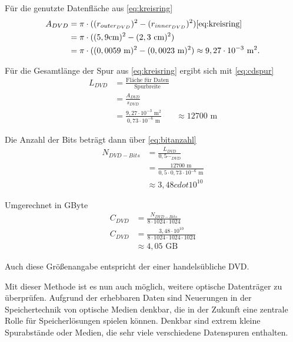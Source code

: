 \documentclass[9pt,twocolumn,twoside]{pnas-new}
\begin{document}
Für die genutzte Datenfläche aus \eqref{eq:kreisring}
\begin{align*}
 A_{DVD} &= \pi\cdot((r_{outer_{DVD}})^2-(r_{inner_{DVD}})^2)  \ref{eq:kreisring}\\	
&= \pi\cdot((5,9\mbox{cm})^2-(2,3\mbox{ cm})^2) \\
 &=  \pi\cdot((0,0059\mbox{ m})^2-(0,0023\mbox{ m})^2) \approx 9,27\cdot10^{-3}\mbox{ m}^2.
\end{align*}

Für die Gesamtlänge der Spur aus \ref{eq:kreisring} ergibt sich mit \eqref{eq:cdspur}
\begin{align*}
 L_{DVD} &= \frac{\mbox{Fläche für Daten}}{\mbox{Spurbreite}}\\
 &= \frac{A_{DVD}}{s_{DVD}}\\
 &= \frac{9,27\cdot10^{-3}\mbox{ m}^2}{0,73\cdot10^{-6}\mbox{ m} }
 &\approx 12700\mbox{ m}
\end{align*}

Die Anzahl der Bits beträgt dann über \eqref{eq:bitanzahl}
\begin{align*}
N_{DVD-Bits} &=  \frac{L_{DVD}}{0,5\cdots_{DVD}}\\
&= \frac{12700\mbox{ m}}{0,5\cdot0,73\cdot10^{-6}\mbox{ m}}\\
&\approx 3,48cdot10^{10}
\end{align*}

Umgerechnet in GByte
\begin{align*}
C_{DVD} &= \frac{N_{DVD-Bits}}{8\cdot1024\cdot1024}\\
C_{DVD} &= \frac{3,48\cdot10^{10}}{8\cdot1024\cdot1024\cdot1024}\\
&\approx 4,05\mbox{ GB}
\end{align*}

Auch diese Größenangabe entspricht der einer handelsübliche DVD.


Mit dieser Methode ist es nun auch möglich, weitere optische Datenträger zu überprüfen.
Aufgrund der erhebbaren Daten sind Neuerungen in der Speichertechnik von optische Medien denkbar, die in der Zukunft eine zentrale Rolle für Speicherlösungen spielen können.
Denkbar sind extrem kleine Spurabstände oder Medien, die sehr viele verschiedene Datenspuren enthalten.


\end{document}
